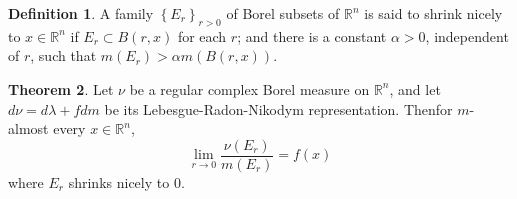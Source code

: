 \documentclass[12pt,a4paper]{book}
\theoremstyle{definition}
\newtheorem{defn}{Definition}[section]
\newtheorem{theo}[defn]{Theorem}
\begin{document}
\begin{defn}
    A family $\left\{E_r\right\}_{r>0}$ of Borel subsets of $\mathbb{R}^n$ is said to shrink nicely to $x \in \mathbb{R}^n$ if $E_r \subset B(r, x)$ for each $r$;
    and there is a constant $\alpha>0$, independent of $r$, such that $m\left(E_r\right)>\alpha m(B(r, x))$.
\end{defn}
\begin{theo}
    Let $\nu$ be a regular complex Borel measure on $\mathbb{R}^n$, and let $d \nu=d \lambda+f d m$ be its Lebesgue-Radon-Nikodym representation. Thenfor $m$-almost every $x \in \mathbb{R}^n$,
    $$
        \lim _{r \rightarrow 0} \frac{\nu\left(E_r\right)}{m\left(E_r\right)}=f(x)
    $$
    where $E_r$ shrinks nicely to $0$.
    \label{Fundamental Theorem of Calculus, generalized version}
\end{theo}
\end{document}
